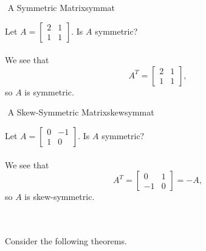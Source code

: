         \begin{example}{\Difficulty\,\,A Symmetric Matrix}{symmat}
        
            Let \(A=\begin{bmatrix} 2 & 1 \\ 1 & 1\end{bmatrix}\). Is \(A\) symmetric?
            \\
            \\
            We see that
            \begin{equation*}
                A^T=\begin{bmatrix} 2 & 1 \\ 1 & 1\end{bmatrix},
            \end{equation*}
            so \(A\) is symmetric.
        
        \end{example}
        \pagebreak
        \begin{example}{\Difficulty\,\,A Skew-Symmetric Matrix}{skewsymmat}
        
            Let \(A=\begin{bmatrix} 0 & -1 \\ 1 & 0\end{bmatrix}\). Is \(A\) symmetric?
            \\
            \\
            We see that
            \begin{equation*}
                A^T=\begin{bmatrix} 0 & 1 \\ -1 & 0\end{bmatrix}=-A,
            \end{equation*}
            so \(A\) is skew-symmetric.
        
        \end{example}
        \vphantom
        \\
        \\
        Consider the following theorems.
